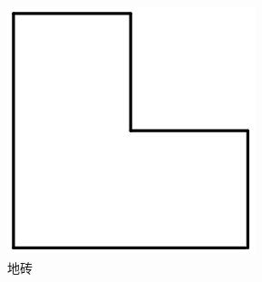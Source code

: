 \documentclass[a4paper]{ctexart}
\begin{document}
\begin{sloppypar}
\begin{theorem}[铺砖定理]
\begin{figure}[h]
\begin{minipage}[t]{0.3\linewidth}
                \centering
                \includegraphics[scale=0.5]{images/brick.png}
                \caption{地砖}
                \label{brick}
            \end{minipage}
        \end{figure}
    \end{theorem}


\end{sloppypar}
\end{document}
